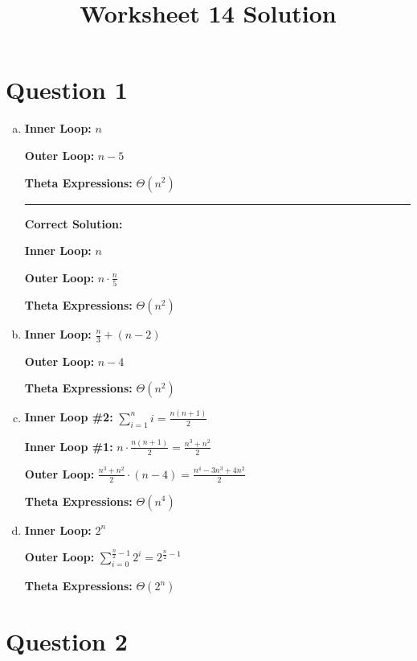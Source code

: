 \documentclass[12pt]{article}
\begin{document}
\title{Worksheet 14 Solution}
\maketitle

\section*{Question 1}
\begin{enumerate}[a.]
    \item

    \textbf{Inner Loop:} $n$

    \textbf{Outer Loop:} $n - 5$

    \textbf{Theta Expressions:} $\Theta (n^2)$

    \noindent\rule{\textwidth}{1pt}

    \textbf{Correct Solution:}

    \bigskip

    \textbf{Inner Loop:} $n$

    \textbf{Outer Loop:} $n \cdot \displaystyle\frac{n}{5}$

    \textbf{Theta Expressions:} $\Theta (n^2)$

    \item

    \textbf{Inner Loop:} $\displaystyle \frac{n}{3} + (n - 2)$

    \textbf{Outer Loop:} $n - 4$

    \textbf{Theta Expressions:} $\Theta (n^2)$

    \item

    \textbf{Inner Loop \#2:} $\sum\limits_{i=1}^n i = \displaystyle\frac{n(n+1)}{2}$

    \textbf{Inner Loop \#1:} $n \cdot \displaystyle\frac{n(n+1)}{2} = \displaystyle\frac{n^3 + n^2}{2}$

    \textbf{Outer Loop:} $\displaystyle\frac{n^3 + n^2}{2} \cdot (n - 4) = \displaystyle\frac{n^4 - 3n^3 + 4n^2}{2}$

    \textbf{Theta Expressions:} $\Theta (n^4)$

    \item

    \textbf{Inner Loop:} $2^n$

    \textbf{Outer Loop:} $\displaystyle\sum\limits_{i=0}^{\frac{n}{2} - 1} 2^i = 2^{\frac{n}{2} - 1}$

    \textbf{Theta Expressions:} $\Theta (2^n)$


\end{enumerate}

\section*{Question 2}
\end{document}

